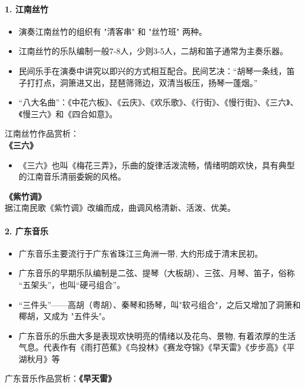 \documentclass[
]{article}
\providecommand{\tightlist}{%
  \setlength{\itemsep}{0pt}\setlength{\parskip}{0pt}}
\begin{document}
\paragraph{1. 江南丝竹}\label{ux6c5fux5357ux4e1dux7af9}

\begin{itemize}
\tightlist
\item
  演奏江南丝竹的组织有 "清客串" 和 "丝竹班" 两种。
\item
  江南丝竹的乐队编制一般7-8人，少则3-5人，二胡和笛子通常为主奏乐器。
\item
  民间乐手在演奏中讲究以即兴的方式相互配合。民间艺决：``胡琴一条线，笛子打打点，洞箫进又出，琵琶筛筛边，双清当板压，扬琴一蓬烟。''
\item
  ``八大名曲''：《中花六板》、《云庆》、《欢乐歌》、《行街》、《慢行街》、《三六》、《慢三六》和《四合如意》。
\end{itemize}

江南丝竹作品赏析：\\
\textbf{《三六》}

\begin{itemize}
\tightlist
\item
  《三六》也叫《梅花三弄》，乐曲的旋律活泼流畅，情绪明朗欢快，具有典型的江南音乐清丽委婉的风格。
\end{itemize}

\textbf{《紫竹调》}\\
据江南民歌《紫竹调》改编而成，曲调风格清新、活泼、优美。

\paragraph{2. 广东音乐}\label{ux5e7fux4e1cux97f3ux4e50}

\begin{itemize}
\tightlist
\item
  广东音乐主要流行于广东省珠江三角洲一带, 大约形成于清末民初。
\item
  广东音乐的早期乐队编制是二弦、提琴（大板胡）、三弦、月琴、笛子，俗称
  ``五架头''，也叫``硬弓组合''。
\item
  ``三件头''------高胡（粤胡）、秦琴和扬琴，叫"软弓组合"，之后又增加了洞箫和椰胡，又成为
  "五件头"。
\item
  广东音乐的乐曲大多是表现欢快明亮的情绪以及花鸟、景物,
  有着浓厚的生活气息。代表作有《雨打芭蕉》《鸟投林》《赛龙夺锦》《早天雷》《步步高》《平湖秋月》等
\end{itemize}

广东音乐作品赏析：\textbf{《早天雷》}
\end{document}
